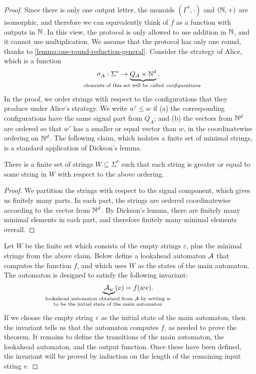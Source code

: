 \begin{proof}
Since there is only one output letter, the monoids $(\Gamma^*,\cdot)$ and $({\mathbb N},+)$ are isomorphic, and therefore we can equivalently think of $f$ as a function with outputs in ${\mathbb N}$. In this view, the protocol is only allowed to use addition in ${\mathbb N}$, and it cannot use multiplication. 
We assume that the protocol has only one round, thanks to \cref{lemma:one-round-reduction-general}. Consider the strategy of Alice, which is a function 
\begin{align*}
\sigma_A : \Sigma^* \to \myunderbrace{Q_A \times \Nat^d}{elements of this set will be called \emph{configurations}}.
\end{align*}
In the proof, we order strings with respect to the configurations that they produce under Alice's strategy. We write $w' \le w$ if (a) the corresponding configurations have the same signal part from $Q_A$; and (b) the vectors from ${\mathbb N}^d$ are ordered so that  $w'$ has a smaller or equal vector than $w$, in the coordinatewise ordering on ${\mathbb N}^d$. The following claim, which isolates a finite set of minimal strings, is a standard application of Dickson's lemma.

\begin{claim}\label{claim:minimal-configurations}
  There is a finite set of strings $W \subseteq \Sigma^*$ such that each string is greater or equal to some string in $W$ with respect to the above ordering.
\end{claim}
\begin{proof}
  We partition the strings with respect to the signal component, which gives us finitely many parts. In each part, the strings are ordered coordinatewise according to the vector from ${\mathbb N}^d$. By Dickson's lemma, there are finitely many minimal elements in each part, and therefore finitely many minimal elements overall.
\end{proof}

Let $W$ be the finite set which consists of the empty strings $\varepsilon$, plus the minimal strings from the above claim. Below define a lookahead automaton ${\mathcal A}$ that computes the function $f$, and which uses $W$ as the states of the main automaton. The automaton is designed to satisfy the following invariant:
\begin{align*}
\myunderbrace{\Aa_w}{lookahead automaton obtained from $\Aa$ by setting $w$ \\ to be the initial state of the main automaton}(v){} = f(wv).
\end{align*}
If we choose the empty string $\varepsilon$ as the initial state of the main automaton, then the invariant tells us that the automaton computes $f$, as needed to prove the theorem. It remains to define the transitions of the main automaton, the lookahead automaton, and the output function. Once these have been defined, the invariant will be proved by induction on the length of the remaining input string $v$.


\end{proof}
